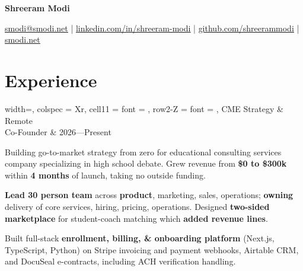 \documentclass[10pt]{article}
\begin{document}
\begin{center}{\huge \bfseries Shreeram Modi}

    \href{mailto:smodi@smodi.net}{\ul{smodi@smodi.net}}
    |
    \href{https://linkedin.com/in/shreeram-modi}{\ul{linkedin.com/in/shreeram-modi}}
    |
    \href{https://github.com/shreerammodi}{\ul{github.com/shreerammodi}}
    |
    \href{https://smodi.net}{\ul{smodi.net}}
\end{center}

\section{Experience}
\vspace{-0.5em}
\titlerule
\vspace{0.5em}

\begin{tblr}{
    width=\textwidth,
    colspec = {Xr},
    cell{1}{1} = {font = {\bfseries}},
    row{2-Z} = {font = {\itshape}},
  }
  CME Strategy                                          & Remote  \\
  Co-Founder & 2026---Present \\
\end{tblr}
\begin{compactitem}
\item
    Building go-to-market strategy from zero for educational consulting
    services company specializing in high school debate. Grew revenue from
    \textbf{\$0 to \$300k} within \textbf{4 months} of launch, taking
    no outside funding.

\item \textbf{Lead 30 person team} across \textbf{product},
    marketing, sales, operations; \textbf{owning} delivery of core
    services, hiring, pricing, operations. Designed \textbf{two-sided
    marketplace} for student-coach matching which \textbf{added revenue lines}.

\item Built full-stack \textbf{enrollment, billing, \& onboarding
    platform} (Next.js, TypeScript, Python) on Stripe invoicing and payment
    webhooks, Airtable CRM, and DocuSeal e-contracts, including ACH
    verification handling.
\end{compactitem}
\end{document}
